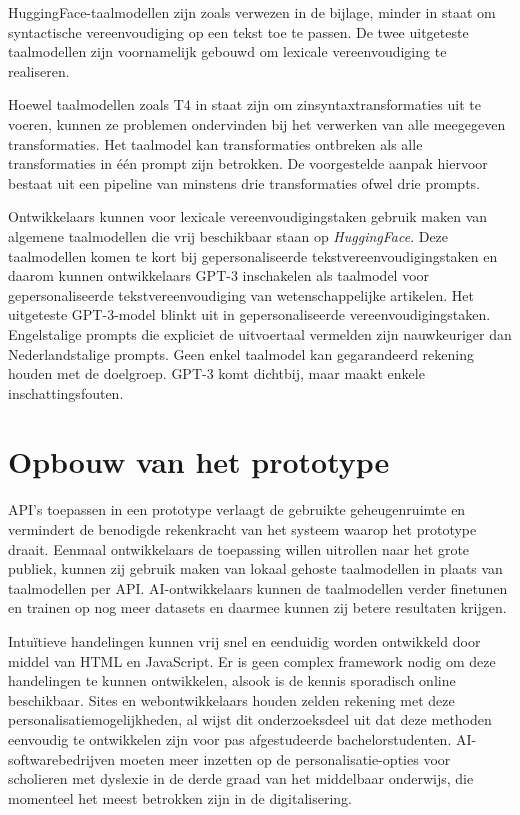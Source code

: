 \medspace

HuggingFace-taalmodellen zijn zoals verwezen in de bijlage, minder in staat om syntactische vereenvoudiging op een tekst toe te passen. De twee uitgeteste taalmodellen zijn voornamelijk gebouwd om lexicale vereenvoudiging te realiseren.

Hoewel taalmodellen zoals T4 in staat zijn om zinsyntaxtransformaties uit te voeren, kunnen ze problemen ondervinden bij het verwerken van alle meegegeven transformaties. Het taalmodel kan transformaties ontbreken als alle transformaties in één prompt zijn betrokken. De voorgestelde aanpak hiervoor bestaat uit een pipeline van minstens drie transformaties ofwel drie prompts. 

\medspace

Ontwikkelaars kunnen voor lexicale vereenvoudigingstaken gebruik maken van algemene taalmodellen die vrij beschikbaar staan op \textit{HuggingFace}. Deze taalmodellen komen te kort bij gepersonaliseerde tekstvereenvoudigingstaken en daarom kunnen ontwikkelaars GPT-3 inschakelen als taalmodel voor gepersonaliseerde tekstvereenvoudiging van wetenschappelijke artikelen. Het uitgeteste GPT-3-model blinkt uit in gepersonaliseerde vereenvoudigingstaken. Engelstalige prompts die expliciet de uitvoertaal vermelden zijn nauwkeuriger dan Nederlandstalige prompts. Geen enkel taalmodel kan gegarandeerd rekening houden met de doelgroep. GPT-3 komt dichtbij, maar maakt enkele inschattingsfouten.

\section{Opbouw van het prototype}

API's toepassen in een prototype verlaagt de gebruikte geheugenruimte en vermindert de benodigde rekenkracht van het systeem waarop het prototype draait. Eenmaal ontwikkelaars de toepassing willen uitrollen naar het grote publiek, kunnen zij gebruik maken van lokaal gehoste taalmodellen in plaats van taalmodellen per API. AI-ontwikkelaars kunnen de taalmodellen verder finetunen en trainen op nog meer datasets en daarmee kunnen zij betere resultaten krijgen.

Intuïtieve handelingen kunnen vrij snel en eenduidig worden ontwikkeld door middel van HTML en JavaScript. Er is geen complex framework nodig om deze handelingen te kunnen ontwikkelen, alsook is de kennis sporadisch online beschikbaar. Sites en webontwikkelaars houden zelden rekening met deze personalisatiemogelijkheden, al wijst dit onderzoeksdeel uit dat deze methoden eenvoudig te ontwikkelen zijn voor pas afgestudeerde bachelorstudenten. AI-softwarebedrijven moeten meer inzetten op de personalisatie-opties voor scholieren met dyslexie in de derde graad van het middelbaar onderwijs, die momenteel het meest betrokken zijn in de digitalisering.

